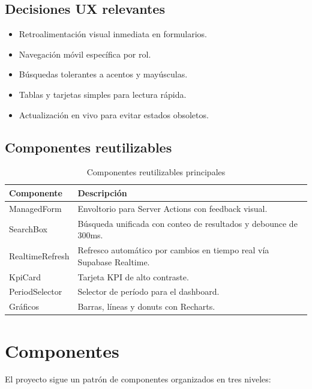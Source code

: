 \documentclass[12pt,a4paper,oneside]{report}
\begin{document}
\section{Decisiones UX relevantes}

\begin{itemize}
  \item Retroalimentación visual inmediata en formularios.
  \item Navegación móvil específica por rol.
  \item Búsquedas tolerantes a acentos y mayúsculas.
  \item Tablas y tarjetas simples para lectura rápida.
  \item Actualización en vivo para evitar estados obsoletos.
\end{itemize}

\section{Componentes reutilizables}

\begin{table}[H]
\centering
\caption{Componentes reutilizables principales}
\begin{tabular}{@{}L{4cm}L{11.5cm}@{}}
\toprule
{}
\textbf{Componente} & \textbf{Descripción} \\
\midrule
ManagedForm & Envoltorio para Server Actions con feedback visual. \\
SearchBox & Búsqueda unificada con conteo de resultados y debounce de 300ms. \\
RealtimeRefresh & Refresco automático por cambios en tiempo real vía Supabase Realtime. \\
KpiCard & Tarjeta KPI de alto contraste. \\
PeriodSelector & Selector de período para el dashboard. \\
Gráficos & Barras, líneas y donuts con Recharts. \\
\bottomrule
\end{tabular}
\end{table}

\chapter{Componentes}

El proyecto sigue un patrón de componentes organizados en tres niveles:
\end{document}
